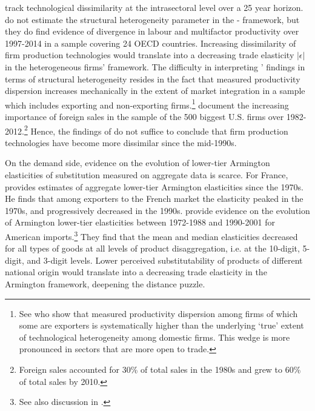 \documentclass[12pt,twoside,a4paper,notitlepage]{article}
\begin{document}
\cite{Andrews2016} track technological dissimilarity at the intrasectoral level over a 25 year horizon.
\cite{Andrews2016} do not estimate the structural heterogeneity parameter in the \cite{Melitz2003}-\cite{Chaney2008} framework, but they do find evidence of divergence in labour and multifactor productivity over 1997-2014 in a sample covering 24 OECD countries.
Increasing dissimilarity of firm production technologies would translate into a decreasing trade elasticity $|\epsilon|$ in the heterogeneous firms' framework.
The difficulty in interpreting \cite{Andrews2016}' findings in terms of structural heterogeneity resides in the fact that measured productivity dispersion increases mechanically in the extent of market integration in a sample which includes exporting and non-exporting firms.\footnote{See \cite{DiGiovanni2011} who show that measured productivity dispersion among firms of which some are exporters is systematically higher than the underlying `true' extent of technological heterogeneity among domestic firms.
This wedge is more pronounced in sectors that are more open to trade.}
\cite{Autor2017} document the increasing importance of foreign sales in the sample of the 500 biggest U.S. firms over 1982-2012.\footnote{Foreign sales accounted for 30\% of total sales in the 1980s and grew to 60\% of total sales by 2010.}
Hence, the findings of \cite{Andrews2016} do not suffice to conclude that firm production technologies have become more dissimilar since the mid-1990s.

On the demand side, evidence on the evolution of lower-tier Armington elasticities of substitution measured on aggregate data is scarce.
For France, \cite{Welsch2006} provides estimates of aggregate lower-tier Armington elasticities since the 1970s.
He finds that among exporters to the French market the elasticity peaked in the 1970s, and progressively decreased in the 1990s.
\cite{Broda2006} provide evidence on the evolution of Armington lower-tier elasticities between 1972-1988 and 1990-2001 for American imports.\footnote{See also discussion in \cite{Head2013}.}
They find that the mean and median elasticities decreased for all types of goods at all levels of product disaggregation, i.e.
at the 10-digit, 5-digit, and 3-digit levels.
Lower perceived substitutability of products of different national origin would translate into a decreasing trade elasticity in the Armington framework,  deepening the distance puzzle. 
\end{document}
